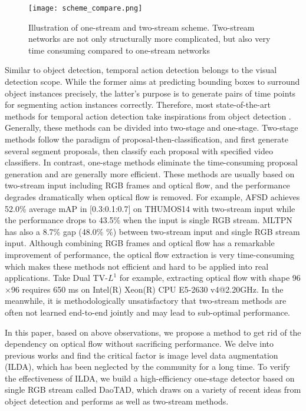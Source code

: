 \documentclass[final]{cvpr}
\begin{document}
\begin{figure}[htp]
    \centering
    \texttt{[image: scheme\_compare.png]}
    \caption{Illustration of one-stream and two-stream scheme. Two-stream networks are not only structurally more complicated, but also very time consuming compared to one-stream networks}
    \label{scheme compare}
\end{figure}

Similar to object detection, temporal action detection belongs to the visual detection scope. While the former aims at predicting bounding boxes to surround object instances precisely, the latter's purpose is to generate pairs of time points for segmenting action instances correctly. Therefore, most state-of-the-art methods \cite{xu2017r, lin2017single, zhang2018s3d, chao2018rethinking, wang2020multi, liu2020progressive, lin2021learning} for temporal action detection take inspirations from object detection \cite{liu2016ssd, cai2018cascade, tian2019fcos}. Generally, these methods can be divided into two-stage and one-stage. Two-stage methods \cite{xu2017r, chao2018rethinking, lin2021learning} follow the paradigm of proposal-then-classification, and first generate several segment proposals, then classify each proposal with specified video classifiers. In contrast, one-stage methods \cite{lin2017single, zhang2018s3d, liu2020progressive, wang2020multi} eliminate the time-consuming proposal generation and are generally more efficient. These methods are usually based on two-stream input including RGB frames and optical flow, and the performance degrades dramatically when optical flow is removed. For example, AFSD \cite{lin2021learning} achieves 52.0\% average mAP in [0.3:0.1:0.7] on THUMOS14 \cite{jiang2014thumos} with two-stream input while the performance drops to 43.5\% when the input is single RGB stream. MLTPN \cite{wang2020multi} has also a 8.7\% gap (48.0\% \%) between two-stream input and single RGB stream input. Although combining RGB frames and optical flow has a remarkable improvement of performance, the optical flow extraction is very time-consuming which makes these methods not efficient and hard to be applied into real applications. Take Dual TV-$L^{1}$ \cite{zach2007duality} for example, extracting optical flow with shape 96$\times$96 requires 650 ms on Intel(R) Xeon(R) CPU E5-2630 v4@2.20GHz. In the meanwhile, it is methodologically unsatisfactory that two-stream methods are often not learned end-to-end jointly and may lead to sub-optimal performance.

In this paper, based on above observations, we propose a method to get rid of the dependency on optical flow without sacrificing performance. We delve into previous works and find the critical factor is image level data augmentation (ILDA), which has been neglected by the community for a long time. To verify the effectiveness of ILDA, we build a high-efficiency one-stage detector based on single RGB stream called DaoTAD, which draws on a variety of recent ideas from object detection and performs as well as two-stream methods.
\end{document}
